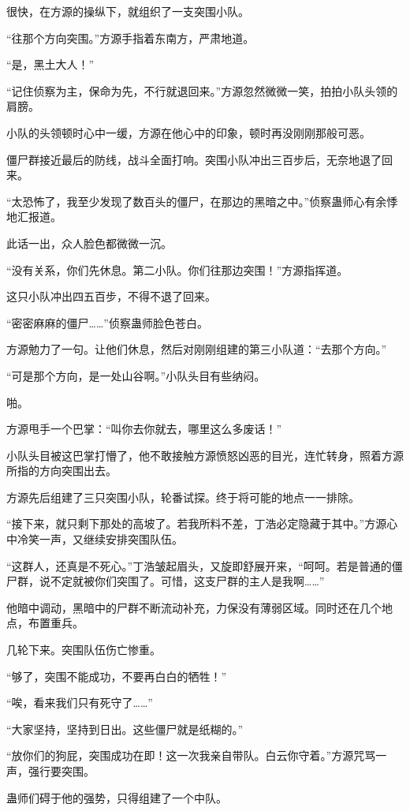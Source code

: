 \begin{this_body}
很快，在方源的操纵下，就组织了一支突围小队。

“往那个方向突围。”方源手指着东南方，严肃地道。

“是，黑土大人！”

“记住侦察为主，保命为先，不行就退回来。”方源忽然微微一笑，拍拍小队头领的肩膀。

小队的头领顿时心中一缓，方源在他心中的印象，顿时再没刚刚那般可恶。

僵尸群接近最后的防线，战斗全面打响。突围小队冲出三百步后，无奈地退了回来。

“太恐怖了，我至少发现了数百头的僵尸，在那边的黑暗之中。”侦察蛊师心有余悸地汇报道。

此话一出，众人脸色都微微一沉。

“没有关系，你们先休息。第二小队。你们往那边突围！”方源指挥道。

这只小队冲出四五百步，不得不退了回来。

“密密麻麻的僵尸……”侦察蛊师脸色苍白。

方源勉力了一句。让他们休息，然后对刚刚组建的第三小队道：“去那个方向。”

“可是那个方向，是一处山谷啊。”小队头目有些纳闷。

啪。

方源甩手一个巴掌：“叫你去你就去，哪里这么多废话！”

小队头目被这巴掌打懵了，他不敢接触方源愤怒凶恶的目光，连忙转身，照着方源所指的方向突围出去。

方源先后组建了三只突围小队，轮番试探。终于将可能的地点一一排除。

“接下来，就只剩下那处的高坡了。若我所料不差，丁浩必定隐藏于其中。”方源心中冷笑一声，又继续安排突围队伍。

“这群人，还真是不死心。”丁浩皱起眉头，又旋即舒展开来，“呵呵。若是普通的僵尸群，说不定就被你们突围了。可惜，这支尸群的主人是我啊……”

他暗中调动，黑暗中的尸群不断流动补充，力保没有薄弱区域。同时还在几个地点，布置重兵。

几轮下来。突围队伍伤亡惨重。

“够了，突围不能成功，不要再白白的牺牲！”

“唉，看来我们只有死守了……”

“大家坚持，坚持到日出。这些僵尸就是纸糊的。”

“放你们的狗屁，突围成功在即！这一次我亲自带队。白云你守着。”方源咒骂一声，强行要突围。

蛊师们碍于他的强势，只得组建了一个中队。


\end{this_body}
